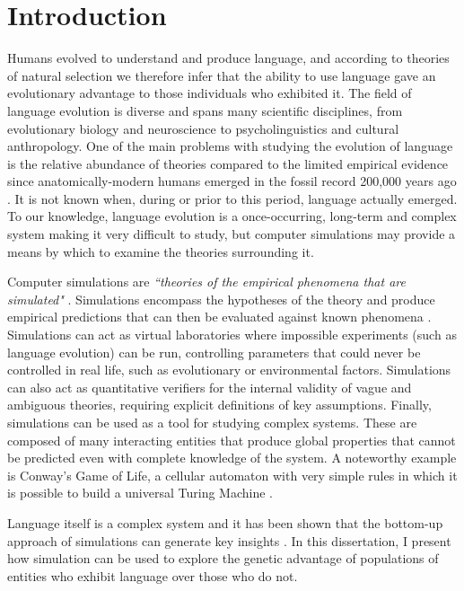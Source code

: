 \documentclass[12pt,a4paper]{report}
\begin{document}

\pagestyle{headings}

\chapter{Introduction}
\setcounter{page}{1}

Humans evolved to understand and produce language, and according to theories of natural selection we therefore infer that the ability to use language gave an evolutionary advantage to those individuals who exhibited it. The field of language evolution is diverse and spans many scientific disciplines, from evolutionary biology and neuroscience to psycholinguistics and cultural anthropology. One of the main problems with studying the evolution of language is the relative abundance of theories compared to the limited empirical evidence since anatomically-modern humans emerged in the fossil record 200,000 years ago \citep{Fleagle2008}. It is not known when, during or prior to this period, language actually emerged. To our knowledge, language evolution is a once-occurring, long-term and complex system making it very difficult to study, but computer simulations may provide a means by which to examine the theories surrounding it.

Computer simulations are \emph{``theories of the empirical phenomena that are simulated"} \citep{Cangelosi2002}. Simulations encompass the hypotheses of the theory and produce empirical predictions that can then be evaluated against known phenomena \citep{cavalli1997genes}. Simulations can act as virtual laboratories where impossible experiments (such as language evolution) can be run, controlling parameters that could never be controlled in real life, such as evolutionary or environmental factors. Simulations can also act as quantitative verifiers for the internal validity of vague and ambiguous theories, requiring explicit definitions of key assumptions. Finally, simulations can be used as a tool for studying complex systems. These are composed of many interacting entities that produce global properties that cannot be predicted even with complete knowledge of the system. A noteworthy example is Conway's Game of Life, a cellular automaton with very simple rules in which it is possible to build a universal Turing Machine \citep{rendell2002turing}.

Language itself is a complex system and it has been shown that the bottom-up approach of simulations can generate key insights \citep{langton1997artificial}. In this dissertation, I present how simulation can be used to explore the genetic advantage of populations of entities who exhibit language over those who do not.
\end{document}
